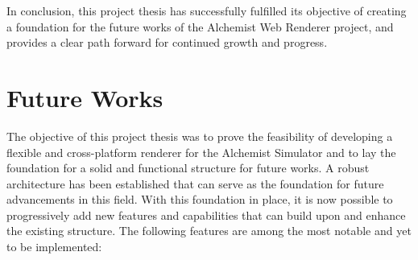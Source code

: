 
In conclusion, this project thesis has successfully fulfilled its objective of creating a foundation for the future works of the Alchemist Web Renderer project, and provides a clear path forward for continued growth and progress.\newline

\section{Future Works}
\label{sec:future-works}
The objective of this project thesis was to prove the feasibility of developing a flexible and cross-platform renderer for the Alchemist Simulator and to lay the foundation for a solid and functional structure for future works. A robust architecture has been established that can serve as the foundation for future advancements in this field. With this foundation in place, it is now possible to progressively add new features and capabilities that can build upon and enhance the existing structure. The following features are among the most notable and yet to be implemented:
